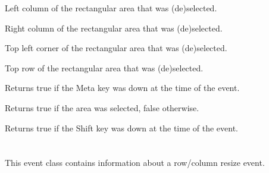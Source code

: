 
Left column of the rectangular area that was (de)selected.

\label{wxgridrangeselecteventgetrightcol}


Right column of the rectangular area that was (de)selected.

\label{wxgridrangeselecteventgettopleftcoords}


Top left corner of the rectangular area that was (de)selected.

\label{wxgridrangeselecteventgettoprow}


Top row of the rectangular area that was (de)selected.

\label{wxgridrangeselecteventmetadown}


Returns true if the Meta key was down at the time of the event.

\label{wxgridrangeselecteventselecting}


Returns true if the area was selected, false otherwise.

\label{wxgridrangeselecteventshiftdown}


Returns true if the Shift key was down at the time of the event.

\section{}\label{wxgridsizeevent}

This event class contains information about a row/column resize event.


\\
\\
\\

